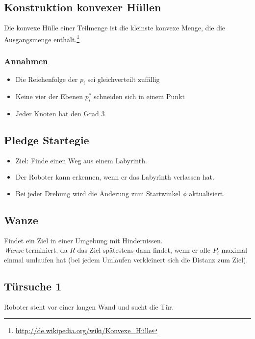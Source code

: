 \subsection{Konstruktion konvexer Hüllen}
Die konvexe Hülle einer Teilmenge ist die kleinste konvexe Menge, die die Ausgangsmenge enthält.\footnote{\url{http://de.wikipedia.org/wiki/Konvexe_Hülle}}

\subsubsection{Annahmen}
\begin{itemize}
	\item Die Reiehenfolge der \(p_i\) sei gleichverteilt zufällig
	\item Keine vier der Ebenen \(p_i^{*}\) schneiden sich in einem Punkt
	\item Jeder Knoten hat den Grad \(3\)
\end{itemize}



\subsection{Pledge Startegie}
\begin{itemize}
	\item Ziel: Finde einen Weg aus einem Labyrinth.
	\item Der Roboter kann erkennen, wenn er das Labyrinth verlassen hat.
	\item Bei jeder Drehung wird die Änderung zum Startwinkel \(\phi\) aktualisiert.
\end{itemize}



\subsection{Wanze}
Findet ein Ziel in einer Umgebung mit Hindernissen.
\text{}\\


\textit{Wanze} terminiert, da \(R\) das Ziel spätestens dann findet, wenn er alle \(P_i\) maximal einmal umlaufen hat (bei jedem Umlaufen verkleinert sich die Distanz zum Ziel).


\subsection{Türsuche 1}
Roboter steht vor einer langen Wand und sucht die Tür.
\text{}\\



